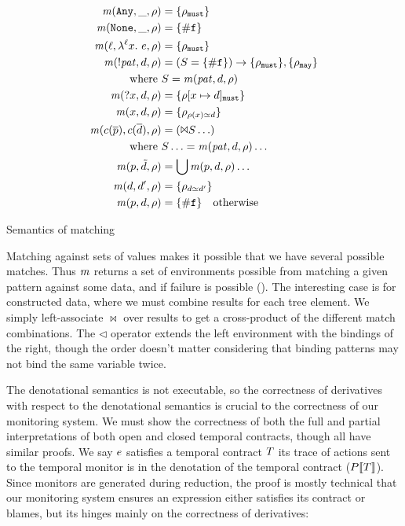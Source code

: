  {\begin{align*}
    \matches(\sany, \_, \menv) &= \setof{\menv_\must} \\
    \matches(\snone, \_, \menv) &= \setof{\nomatch} \\
    \matches(\mtoplevelname, \snlam{\mtoplevelname}{\mvar}{\mexp}, \menv) &= \setof{\menv_\must} \\
    \matches(\snegpat{\mvpat}, \mdata, \menv) &= (S = \setof{\nomatch}) \to \setof{\menv_\must}, \setof{\menv_\may} \\
    \text{where }& S = \matches(\mvpat, \mdata, \menv) \\
    \matches(\sbind{\mvar}, \mdata, \menv) &= \setof{\menv[\mvar \mapsto \mdata]_\must} \\
    \matches(\mvar, \mdata, \menv) &= \setof{\menv_{\menv(\mvar) \simeq \mdata}} \\
    \matches(\mconstructor(\many{\mpat}), \mconstructor(\many{\mdata}), \menv) &= (\Bowtie S \ldots) \\
    \text{where }& S \ldots = \matches(\mvpat, \mdata, \menv) \ldots \\
    \matches(\mpat, \isset{\mdata}, \menv) &= \bigcup \matches(\mpat,\mdata,\menv)\ldots \\
    \matches(\mdata, \mdata', \menv) &= \setof{\menv_{\mdata \simeq \mdata'}} \\
    \matches(\mpat, \mdata, \menv) &= \setof{\nomatch} \quad
    \text{otherwise}
  \end{align*}}{\caption{Semantics of matching}\label{fig:matchsem}}

Matching against sets of values makes it possible that we have several possible matches.
%
Thus $\mathit{m}$ returns a set of environments possible from matching a given pattern against some data, and if failure is possible (\nomatch).
%
The interesting case is for constructed data, where we must combine results for each tree element.
%
We simply left-associate $\bowtie$ over results to get a cross-product of the different match combinations.
%
The $\triangleleft$ operator extends the left environment with the bindings of the right, though the order doesn't matter considering that binding patterns may not bind the same variable twice.
%

The denotational semantics is not executable, so the correctness of derivatives with respect to the denotational semantics is crucial to the correctness of our monitoring system.
%
We must show the correctness of both the full and partial interpretations of both open and closed temporal contracts, though all have similar proofs.
%
We say $e$ satisfies a temporal contract $T$ its trace of actions sent to the temporal monitor is in the denotation of the temporal contract ($P[\![ T ]\!]$).
%
Since monitors are generated during reduction, the proof is mostly technical that our monitoring system ensures an expression either satisfies its contract or blames, but its hinges mainly on the correctness of derivatives:
%

